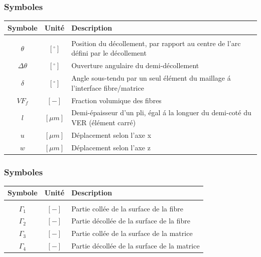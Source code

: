 \documentclass[first,firstsupp,lastsupp,handout,last,hyperref,table]{ETHclass}
\begin{document}
\begin{frame}
\frametitle{Symboles}
\vspace{-0.25cm}
\footnotesize
\centering
\captionsetup[figure]{font=scriptsize,labelfont=scriptsize}
\begin{table}[htbp]

  \centering
    \begin{tabularx}{\textwidth}{ccX}
    \textbf{Symbole}&\textbf{Unit\'e} & \textbf{Description} \\[3pt]
    \midrule\\[12pt]
	$\theta$ & $\left[^{\circ}\right]$ & Position du d\'ecollement, par rapport au centre de l'arc d\'efini par le d\'ecollement\\[1.5pt]
	$\Delta\theta$ & $\left[^{\circ}\right]$ & Ouverture angulaire du demi-d\'ecollement\\[4pt]
	$\delta$ & $\left[^{\circ}\right]$ & Angle sous-tendu par un seul \'el\'ement du maillage \'a l'interface fibre/matrice\\[3pt]
	$VF_{f}$ & $\left[-\right]$ & Fraction volumique des fibres\\[1.5pt]
	$l$ & $\left[\mu m\right]$ & Demi-\'epaisseur d'un pli, \'egal \'a la longuer du demi-cot\'e du VER (\'el\'ement carr\'e)\\[3pt]
	$u$ & $\left[\mu m\right]$ & D\'eplacement selon l'axe x\\[1.5pt]
	$w$ & $\left[\mu m\right]$ & D\'eplacement selon l'axe z\\
    \end{tabularx}%
  \label{tab:phaseprop}%
\end{table}%
\end{frame}

\begin{frame}
\frametitle{Symboles}
\vspace{-0.25cm}
\footnotesize
\centering
\captionsetup[figure]{font=scriptsize,labelfont=scriptsize}
\begin{table}[htbp]

  \centering
    \begin{tabularx}{\textwidth}{ccX}
    \textbf{Symbole}&\textbf{Unit\'e} & \textbf{Description} \\[3pt]
    \midrule\\[12pt]
	$\Gamma_{1}$ & $\left[-\right]$ & Partie coll\'ee de la surface de la fibre\\[1.5pt]
	$\Gamma_{2}$ & $\left[-\right]$ & Partie d\'ecoll\'ee de la surface de la fibre\\[1.5pt]
	$\Gamma_{3}$ & $\left[-\right]$ & Partie coll\'ee de la surface de la matrice\\[1.5pt]
	$\Gamma_{4}$ & $\left[-\right]$ & Partie d\'ecoll\'ee de la surface de la matrice\\[1.5pt]
    \end{tabularx}%
  \label{tab:phaseprop}%
\end{table}%
\end{frame}
\end{document}
